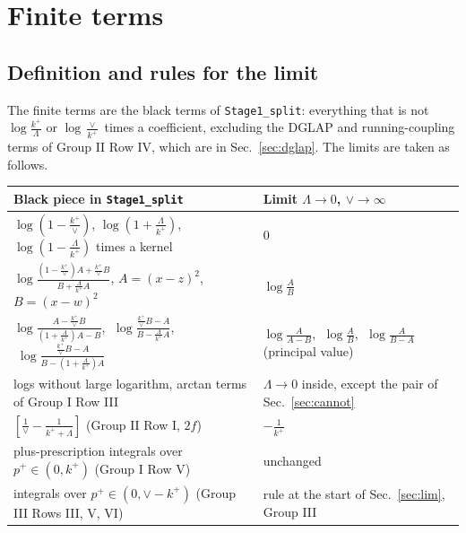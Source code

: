 \documentclass[9pt]{article}
\numberwithin{equation}{section}
\begin{document}
\section{Finite terms}
\subsection{Definition and rules for the limit}
The finite terms are the black terms of \texttt{Stage1\_split}: everything that is not $\log\frac{k^{+}}{\Lambda}$ or $\log\frac{\vee}{k^{+}}$ times a coefficient, excluding the DGLAP and running-coupling terms of Group II Row IV, which are in Sec.~\ref{sec:dglap}. The limits are taken as follows.
\begin{center}
\begin{tabular}{p{}p{}}
\hline
Black piece in \texttt{Stage1\_split} & Limit $\Lambda\to0$, $\vee\to\infty$\\
\hline
$\log(1-\frac{k^{+}}{\vee})$, $\log(1+\frac{\Lambda}{k^{+}})$, $\log(1-\frac{\Lambda}{k^{+}})$ times a kernel & $0$\\
$\log\frac{(1-\frac{k^{+}}{\vee})A+\frac{k^{+}}{\vee}B}{B+\frac{\Lambda}{k^{+}}A}$, $A=(x-z)^{2}$, $B=(x-w)^{2}$ & $\log\frac{A}{B}$\\
$\log\frac{A-\frac{k^{+}}{\vee}B}{(1+\frac{\Lambda}{k^{+}})A-B}$, $\;\log\frac{\frac{k^{+}}{\vee}B-A}{B-\frac{\Lambda}{k^{+}}A}$, $\;\log\frac{\frac{k^{+}}{\vee}B-A}{B-(1+\frac{\Lambda}{k^{+}})A}$ & $\log\frac{A}{A-B}$, $\;\log\frac{A}{B}$, $\;\log\frac{A}{B-A}$ (principal value)\\
logs without large logarithm, arctan terms of Group I Row III & $\Lambda\to0$ inside, except the pair of Sec.~\ref{sec:cannot}\\
$[\frac{1}{\vee}-\frac{1}{k^{+}+\Lambda}]$ (Group II Row I, $2f$) & $-\frac{1}{k^{+}}$\\
plus-prescription integrals over $p^{+}\in(0,k^{+})$ (Group I Row V) & unchanged\\
integrals over $p^{+}\in(0,\vee-k^{+})$ (Group III Rows III, V, VI) & rule at the start of Sec.~\ref{sec:lim}, Group III\\
\hline
\end{tabular}
\end{center}
\end{document}
